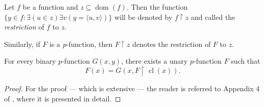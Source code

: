 \begin{definition}[Restriction]
    \label{def:IsFunc.restr+pFunc.restr}
    Let $f$ be a function and $z \subseteq \operatorname{dom}(f)$.
    Then the function $\{y \in f : \exists (u \in z) \exists v (y = \langle u,v \rangle)\}$
    will be denoted by $f \upharpoonright z$ and called the \textit{restriction} of $f$ to $z$.

    Similarly, if $F$ is a \textit{p}-function, then $F \upharpoonright z$ denotes the 
    restriction of $F$ to $z$.
\end{definition}

\begin{theorem}
    \label{thm:rank.exists_pFuncRecursive}
    For every binary $p$-function $G(x,y)$, there exists a unary $p$-function $F$ such that
    $$
    F(x) = G(x, F \upharpoonright \operatorname{cl}(x)).
    $$
\end{theorem}

\begin{proof}
    For the proof — which is extensive — the reader is referred to 
    Appendix 4 of \cite{swierczkowski2003finite}, where it is presented in detail.
\end{proof}

